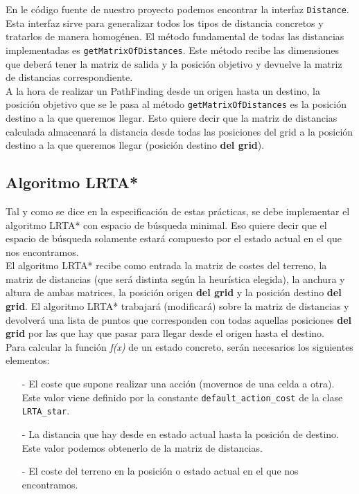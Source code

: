 En le código fuente de nuestro proyecto podemos encontrar la interfaz \texttt{Distance}. Esta interfaz sirve para generalizar todos los tipos de distancia concretos y tratarlos de manera homogénea. El método fundamental de todas las distancias implementadas es \texttt{getMatrixOfDistances}. Este método recibe las dimensiones que deberá tener la matriz de salida y la posición objetivo y devuelve la matriz de distancias correspondiente. \\

A la hora de realizar un PathFinding desde un origen hasta un destino, la posición objetivo que se le pasa al método \texttt{getMatrixOfDistances} es la posición destino a la que queremos llegar. Esto quiere decir que la matriz de distancias calculada almacenará la distancia desde todas las posiciones del grid a la posición destino a la que queremos llegar (posición destino \textbf{del grid}).

\subsection{Algoritmo LRTA*}

Tal y como se dice en la especificación de estas prácticas, se debe implementar el algoritmo LRTA* con espacio de búsqueda minimal. Eso quiere decir que el espacio de búsqueda solamente estará compuesto por el estado actual en el que nos encontramos. \\

El algoritmo LRTA* recibe como entrada la matriz de costes del terreno, la matriz de distancias (que será distinta según la heurística elegida), la anchura y altura de ambas matrices, la posición origen \textbf{del grid} y la posición destino \textbf{del grid}. El algoritmo LRTA* trabajará (modificará) sobre la matriz de distancias y devolverá una lista de puntos que corresponden con todas aquellas posiciones \textbf{del grid} por las que hay que pasar para llegar desde el origen hasta el destino. \\ 

Para calcular la función \textit{f(x)} de un estado concreto, serán necesarios los siguientes elementos:
\begin{itemize}
	\item[-] El coste que supone realizar una acción (movernos de una celda a otra). Este valor viene definido por la constante \texttt{default\_action\_cost} de la clase \texttt{LRTA\_star}.
	\item[-] La distancia que hay desde en estado actual hasta la posición de destino. Este valor podemos obtenerlo de la matriz de distancias.
	\item[-] El coste del terreno en la posición o estado actual en el que nos encontramos.
\end{itemize}

